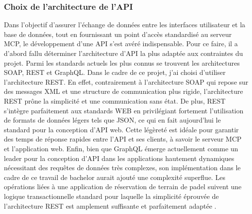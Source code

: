 \documentclass[12pt]{article}
\begin{document}
\subsubsection{Choix de l'architecture de l'API}
Dans l'objectif d'assurer l'échange de données entre les interfaces utilisateur et la base de données, tout en fournissant un point d'accès standardisé au serveur MCP, le développement d'une API s'est avéré indispensable. 
\newline\newline
Pour ce faire, il a d'abord fallu déterminer l'architecture d'API la plus adaptée aux contraintes du projet. Parmi les standards actuels les plus connus se trouvent les architectures SOAP, REST et GraphQL. Dans le cadre de ce projet, j'ai choisi d'utiliser l'architecture REST.
En effet, contrairement à l'architecture SOAP qui repose sur des messages XML et une structure de communication plus rigide, l'architecture REST prône la simplicité et une communication sans état. 
\newline\newline
De plus, REST s'intègre parfaitement aux standards WEB en privilégiant fortement l'utilisation de formats de données légers tels que JSON, ce qui en fait aujourd'hui le standard pour la conception d'API web. Cette légèreté est idéale pour garantir des temps de réponse rapides entre l'API et ses clients, à savoir le serveur MCP et l'application web.
\newline\newline
Enfin, bien que GraphQL émerge actuellement comme un leader pour la conception d'API dans les applications hautement dynamiques nécessitant des requêtes de données très complexes, son implémentation dans le cadre de ce travail de bachelor aurait ajouté une complexité superflue. Les opérations liées à une application de réservation de terrain de padel suivent une logique transactionnelle standard pour laquelle la simplicité éprouvée de l'architecture REST est amplement suffisante et parfaitement adaptée \parencite{addanki_architectural_2025}.
\end{document}
